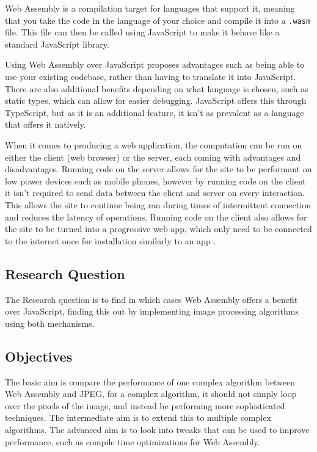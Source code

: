 \documentclass[12pt,a4paper]{article}
\begin{document}
Web Assembly is a compilation target for languages that support it, meaning that you take the code in the language of your choice and compile it into a \texttt{.wasm} file. This file can then be called using JavaScript to make it behave like a standard JavaScript library.


Using Web Assembly over JavaScript proposes advantages such as being able to use your existing codebase, rather than having to translate it into JavaScript. There are also additional benefits depending on what language is chosen, such as static types, which can allow for easier debugging. JavaScript offers this through TypeScript, but as it is an additional feature, it isn't as prevalent as a language that offers it natively.

When it comes to producing a web application, the computation can be run on either the client (web browser) or the server, each coming with advantages and disadvantages. Running code on the server allows for the site to be performant on low power devices such as mobile phones, however by running code on the client it isn't required to send data between the client and server on every interaction. This allows the site to continue being ran during times of intermittent connection and reduces the latency of operations. Running code on the client also allows for the site to be turned into a progressive web app, which only need to be connected to the internet once for installation similarly to an app \cite{biorn2017progressive}.


\subsection{Research Question}

The Research question is to find in which cases Web Assembly offers a benefit over JavaScript, finding this out by implementing image processing algorithms using both mechanisms.

\subsection{Objectives}

The basic aim is compare the performance of one complex algorithm between Web Assembly and JPEG, for a complex algorithm, it should not simply loop over the pixels of the image, and instead be performing more sophisticated techniques. The intermediate aim is to extend this to multiple complex algorithms. The advanced aim is to look into tweaks that can be used to improve performance, such as compile time optimizations for Web Assembly.
\end{document}
